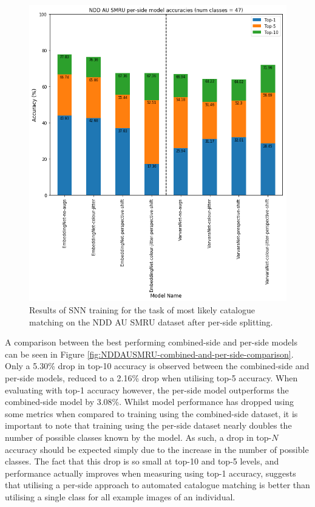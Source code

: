 \begin{figure}[t]
	\begin{center}
		\includegraphics[scale=0.5]{Chapter5/figs/NDDAUSMRU-per-side-SNN-model-accuracies.png}
	\end{center}
	\caption{Results of SNN training for the task of most likely catalogue matching on the NDD AU SMRU dataset after per-side splitting.}
	\label{fig:NDDAUSMRU-per-side-SNN-model-accuracies}
\end{figure}

 A comparison between the best performing combined-side and per-side models can be seen in Figure \ref{fig:NDDAUSMRU-combined-and-per-side-comparison}. Only a 5.30\% drop in top-10 accuracy is observed between the combined-side and per-side models, reduced to a 2.16\% drop when utilising top-5 accuracy. When evaluating with top-1 accuracy however, the per-side model outperforms the combined-side model by 3.08\%. Whilst model performance has dropped using some metrics when compared to training using the combined-side dataset, it is important to note that training using the per-side dataset nearly doubles the number of possible classes known by the model. As such, a drop in top-$N$ accuracy should be expected simply due to the increase in the number of possible classes. The fact that this drop is so small at top-10 and top-5 levels, and performance actually improves when measuring using top-1 accuracy, suggests that utilising a per-side approach to automated catalogue matching is better than utilising a single class for all example images of an individual.

